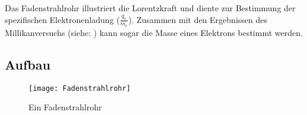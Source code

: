 




%
%	





Das Fadenstrahlrohr illustriert die Lorentzkraft und diente zur Bestimmung der spezifischen Elektronenladung ($\frac{q_e}{m_e}$). Zusammen mit den Ergebnissen des Millikanversuchs (siehe: ) kann sogar die Masse eines Elektrons bestimmt werden.

\subsection{Aufbau}

\begin{figure}[h!]
	\centering
	\texttt{[image: Fadenstrahlrohr]}
	\caption{Ein Fadenstrahlrohr}
	\label{fig:Fadenstrahlrohr}
\end{figure}

